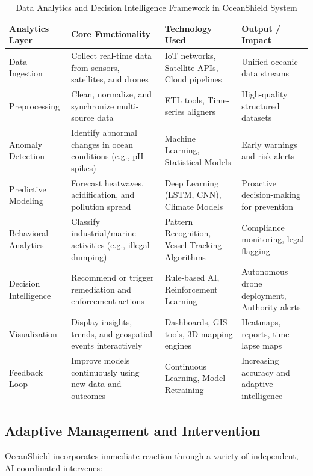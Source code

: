 \documentclass[a4paper]{article}
\begin{document}
\begin{table}[ht]
\centering
\begin{tabular}{|p{3.5cm}|p{4.5cm}|p{3.5cm}|p{4.5cm}|}
\hline
\textbf{Analytics Layer} & \textbf{Core Functionality} & \textbf{Technology Used} & \textbf{Output / Impact} \\\hline
Data Ingestion & Collect real-time data from sensors, satellites, and drones & IoT networks, Satellite APIs, Cloud pipelines & Unified oceanic data streams \\\hline
Preprocessing & Clean, normalize, and synchronize multi-source data & ETL tools, Time-series aligners & High-quality structured datasets \\\hline
Anomaly Detection & Identify abnormal changes in ocean conditions (e.g., pH spikes) & Machine Learning, Statistical Models & Early warnings and risk alerts \\\hline
Predictive Modeling & Forecast heatwaves, acidification, and pollution spread & Deep Learning (LSTM, CNN), Climate Models & Proactive decision-making for prevention \\\hline
Behavioral Analytics & Classify industrial/marine activities (e.g., illegal dumping) & Pattern Recognition, Vessel Tracking Algorithms & Compliance monitoring, legal flagging \\\hline
Decision Intelligence & Recommend or trigger remediation and enforcement actions & Rule-based AI, Reinforcement Learning & Autonomous drone deployment, Authority alerts \\\hline
Visualization & Display insights, trends, and geospatial events interactively & Dashboards, GIS tools, 3D mapping engines & Heatmaps, reports, time-lapse maps \\\hline
Feedback Loop & Improve models continuously using new data and outcomes & Continuous Learning, Model Retraining & Increasing accuracy and adaptive intelligence \\\hline
\end{tabular}
\caption{\label{tab:analytics-decision}Data Analytics and Decision Intelligence Framework in OceanShield System}
\end{table}

\subsection{Adaptive Management and Intervention}

OceanShield incorporates immediate reaction through a variety of independent, AI-coordinated intervenes:
\end{document}
